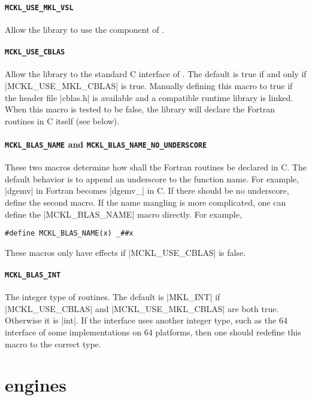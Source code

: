 \paragraph{\texttt{MCKL\_USE\_MKL\_VSL}} Allow the library to use the \vsl
component of \mkl.

\paragraph{\texttt{MCKL\_USE\_CBLAS}} Allow the library to the standard C
interface of \blas. The default is true if and only if |MCKL_USE_MKL_CBLAS| is
true. Manually defining this macro to true if the header file |cblas.h| is
available and a compatible runtime library is linked. When this macro is tested
to be false, the library will declare the \blas Fortran routines in C itself
(see below).

\paragraph{\texttt{MCKL\_BLAS\_NAME} and
\texttt{MCKL\_BLAS\_NAME\_NO\_UNDERSCORE}} These two macros determine how shall
the \blas Fortran routines be declared in C. The default behavior is to append
an underscore to the function name. For example, |dgemv| in Fortran becomes
|dgemv_| in C. If there should be no underscore, define the second macro. If
the name mangling is more complicated, one can define the |MCKL_BLAS_NAME|
macro directly. For example,
\begin{Verbatim}
#define MCKL_BLAS_NAME(x) _##x
\end{Verbatim}
These macros only have effects if |MCKL_USE_CBLAS| is false.

\paragraph{\texttt{MCKL\_BLAS\_INT}} The integer type of \blas routines. The
default is |MKL_INT| if |MCKL_USE_CBLAS| and |MCKL_USE_MKL_CBLAS| are both
true. Otherwise it is |int|. If the \blas interface uses another integer type,
such as the \ilp{}64 interface of some implementations on \lp{}64 platforms,
then one should redefine this macro to the correct type.

\section{\texorpdfstring{\protect\rng}{RNG} engines}
\label{sec:RNG engines}

